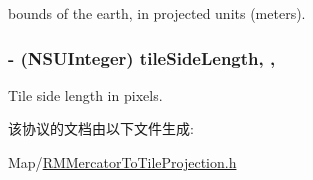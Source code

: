bounds of the earth, in projected units (meters). 

\hypertarget{protocol_r_m_mercator_to_tile_projection-p_a9e7426ca0ae5a5375822f500a49cd829}{
\subsubsection[{tile\-Side\-Length}]{\setlength{\rightskip}{0pt plus 5cm}-\/ (N\-S\-U\-Integer) tile\-Side\-Length\hspace{0.3cm}{\ttfamily [read]}, {\ttfamily [nonatomic]}, {\ttfamily [assign]}}}\label{protocol_r_m_mercator_to_tile_projection-p_a9e7426ca0ae5a5375822f500a49cd829}


Tile side length in pixels. 



该协议的文档由以下文件生成\-:\begin{DoxyCompactItemize}
\item 
Map/\hyperlink{_r_m_mercator_to_tile_projection_8h}{R\-M\-Mercator\-To\-Tile\-Projection.\-h}\end{DoxyCompactItemize}
